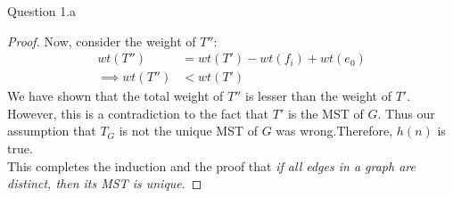 \begin{solution}{Question 1.a}
\begin{proof}
        Now, consider the weight of $T''$:
        \begin{equation}
            \begin{split}
                wt(T'')&=wt(T')-wt(f_i)+wt(e_0)\\
                \implies wt(T'') &< wt(T')
            \end{split}
        \end{equation}
        We have shown that the total weight of $T''$ is lesser than the weight of $T'$. However, this is a contradiction to the fact that $T'$ is the MST of $G$. Thus our assumption that $T_G$ is not the unique MST of $G$ was wrong.Therefore, $h(n)$ is true.\\

        This completes the induction and the proof that \textit{if all edges in a graph are distinct, then its MST is unique}.
    \end{proof}
\end{solution}

